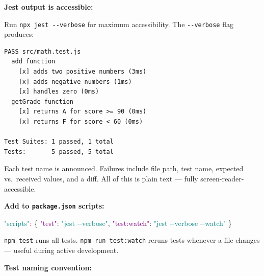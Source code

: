 \documentclass[
  justified,
  openright,
]{tufte-book}
\newcommand{\DataTypeTok}[1]{\textcolor{Purple}{#1}}
\newcommand{\ErrorTok}[1]{\textcolor{Red}{#1}}
\newcommand{\FunctionTok}[1]{\textcolor{BrandBlue}{#1}}
\newcommand{\StringTok}[1]{\textcolor{Teal}{#1}}
\newenvironment{Shaded}{%
  \begin{snugshade}
}{%
  \end{snugshade}
}
\begin{document}
\textbf{Jest output is accessible:}

Run \texttt{npx\ jest\ -\/-verbose} for maximum accessibility. The
\texttt{-\/-verbose} flag produces:

\begin{verbatim}
PASS src/math.test.js
  add function
    [x] adds two positive numbers (3ms)
    [x] adds negative numbers (1ms)
    [x] handles zero (0ms)
  getGrade function
    [x] returns A for score >= 90 (0ms)
    [x] returns F for score < 60 (0ms)

Test Suites: 1 passed, 1 total
Tests:       5 passed, 5 total
\end{verbatim}

Each test name is announced. Failures include file path, test name,
expected vs.~received values, and a diff. All of this is plain text ---
fully screen-reader-accessible.

\textbf{Add to \texttt{package.json} scripts:}

\begin{Shaded}
\begin{Highlighting}[]
\StringTok{"scripts"}\ErrorTok{:} \FunctionTok{\{}
    \DataTypeTok{"test"}\FunctionTok{:} \StringTok{"jest {-}{-}verbose"}\FunctionTok{,}
    \DataTypeTok{"test:watch"}\FunctionTok{:} \StringTok{"jest {-}{-}verbose {-}{-}watch"}
\FunctionTok{\}}
\end{Highlighting}
\end{Shaded}

\texttt{npm\ test} runs all tests. \texttt{npm\ run\ test:watch} reruns
tests whenever a file changes --- useful during active development.

\textbf{Test naming convention:}
\end{document}
